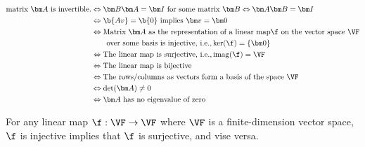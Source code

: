 \begin{theorem}
    \begin{align*}
        \textnormal{matrix } \bm A \textnormal{ is invertible.}
        &\Leftrightarrow \bm B \bm A = \bm I \textnormal{ for some matrix } \bm B 
        \Leftrightarrow   \bm A \bm B = \bm I\\
        &\Leftrightarrow \b{Av} = \b{0} \textnormal{ implies } \bm v = \bm 0 \\
        &\Leftrightarrow \textnormal{Matrix } \bm A \textnormal{ as the representation of a linear map} \f \textnormal{ on the vector space } \VF  \\ 
        & \qquad \textnormal{over some basis is injective, i.e.,} \operatorname{ker}(\f) = \{ \bm 0 \}  \\
        &\Leftrightarrow \textnormal{The linear map is surjective, i.e.,} \operatorname{imag}(\f) = \VF \\
        &\Leftrightarrow \textnormal{The linear map is bijective} \\
        &\Leftrightarrow \textnormal{The rows/columns as vectors form a basis of the space } \VF \\
        &\Leftrightarrow \det(\bm A) \neq 0 \\
        &\Leftrightarrow \bm A \textnormal{ has no eigenvalue of zero} 
    \end{align*}
\end{theorem}


\begin{remark}
For any linear map $\f: \VF \to \VF$ where $\VF$ is a finite-dimension vector space, $\f$ is injective implies that $\f$ is surjective, and vise versa.
\end{remark}
